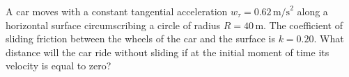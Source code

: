 \item A car moves with a constant tangential acceleration \( w_\tau = 0.62 \, \text{m/s}^2 \) along a horizontal surface circumscribing a circle of radius \( R = 40 \, \text{m} \). The coefficient of sliding friction between the wheels of the car and the surface is \( k = 0.20 \). What distance will the car ride without sliding if at the initial moment of time its velocity is equal to zero?